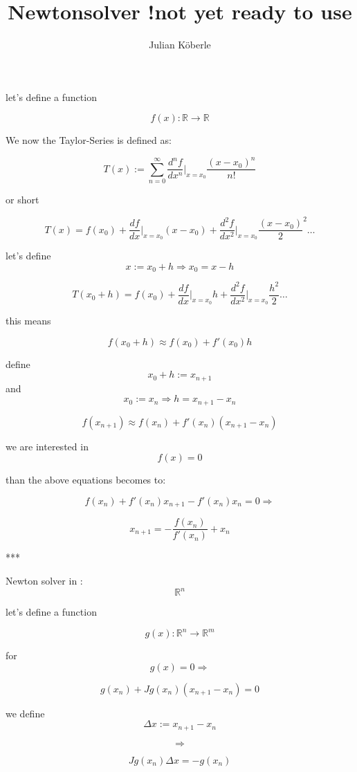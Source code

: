 

\title{Newtonsolver !not yet ready to use}
\author{Julian Köberle}

\maketitle



let's define a function

$$f(x) : \mathbb{R} \rightarrow \mathbb{R}$$

We now the Taylor-Series is defined as:

$$ T(x) := \sum_{n=0}^{\infty} \frac{d^nf}{dx^n} \vert_{x=x_0}^{} \frac{(x-x_0)^n}{n!}$$

or short

$$T(x) = f(x_0)+\frac{df}{dx}\vert_{x=x_0}^{} (x-x_0) + \frac{d^2f}{dx^2}\vert_{x=x_0}^{} \frac{(x-x_0)}{2}^2 \dots$$

let's define $$x := x_0 + h \Rightarrow x_0 = x-h$$


$$T(x_0+h) = f(x_0)+\frac{df}{dx}\vert_{x=x_0}^{} h + \frac{d^2f}{dx^2}\vert_{x=x_0}^{} \frac{h^2}{2} \dots$$

this means

$$f(x_0+h) \approx f(x_0)+ f'(x_0)h$$

define  $$x_0+h := x_{n+1}$$ and $$x_0 := x_n \Rightarrow h= x_{n+1}-x_n$$

$$f(x_{n+1}) \approx f(x_n)+ f'(x_n) (x_{n+1}-x_n)$$

we are interested in $$f(x)=0$$ 

than the above equations becomes to:

$$f(x_n)+ f'(x_n)x_{n+1} -f'(x_n)x_n = 0 \Rightarrow$$

$$x_{n+1}  = - \frac{f(x_n)}{f'(x_n)} + x_n$$

***

Newton solver in : $$\mathbb{R}^n$$

let's define a function

$$g(x) : \mathbb{R}^n \rightarrow \mathbb{R}^m$$

for $$g(x)=0 \Rightarrow$$

$$g(x_n)+ Jg(x_n) (x_{n+1}-x_n) = 0$$

we define $$\Delta x := x_{n+1}-x_n$$

$$\Rightarrow$$

$$Jg(x_n)\Delta x = -g(x_n)$$

